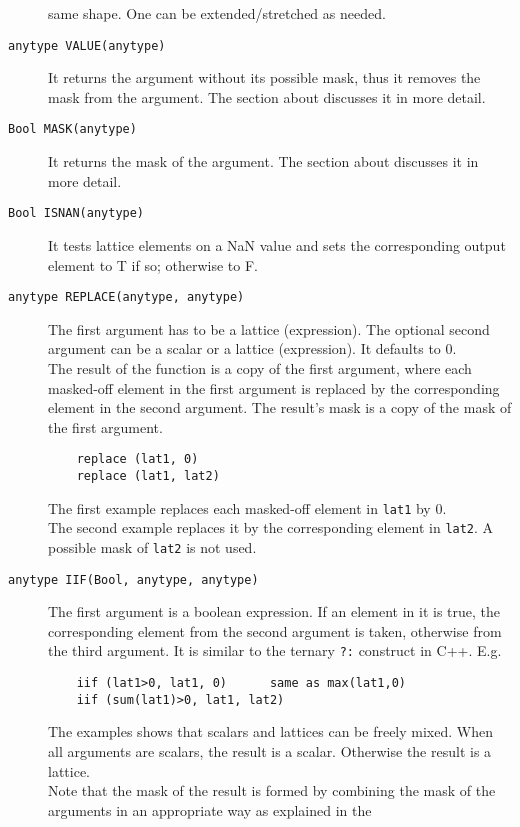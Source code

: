 \begin{description}
    same shape. One can be extended/stretched as needed.
  \item[ \texttt{anytype VALUE(anytype)}]
    It returns the argument without its possible mask, thus it removes
    the mask from the argument.
    The section about 
    discusses it in more detail.
  \item[ \texttt{Bool MASK(anytype)}]
    It returns the mask of the argument.
    The section about 
    discusses it in more detail.
  \item[ \texttt{Bool ISNAN(anytype)}]
    It tests lattice elements on a NaN value and sets the corresponding
    output element to T if so; otherwise to F.
  \item[ \texttt{anytype REPLACE(anytype, anytype)}]
    The first argument has to be a lattice (expression).
    The optional second argument can be a scalar or a lattice
    (expression). It defaults to 0.
    \\The result of the function is a copy of the first argument,
    where each masked-off element in the first argument is replaced by the
    corresponding element in the second argument. The result's mask is
    a copy of the mask of the first argument.
    \begin{verbatim}
    replace (lat1, 0)
    replace (lat1, lat2)
    \end{verbatim}
    The first example replaces each masked-off element in
    \texttt{lat1} by 0.
    \\The second example replaces it by the corresponding element in
    \texttt{lat2}. A possible mask of \texttt{lat2} is not used.
  \item[ \texttt{anytype IIF(Bool, anytype, anytype)}]
    The first argument is a boolean expression. If an element in
    it is true, the corresponding element from the second argument is
    taken, otherwise from the third argument. It is similar to the
    ternary \texttt{?:} construct in C++. E.g.
    \begin{verbatim}
    iif (lat1>0, lat1, 0)      same as max(lat1,0)
    iif (sum(lat1)>0, lat1, lat2)
    \end{verbatim}
    The examples shows that scalars and lattices can be freely mixed.
    When all arguments are scalars, the result is a scalar. Otherwise
    the result is a lattice.
    \\ Note that the mask of the result is formed by combining the
    mask of the arguments in an appropriate way as explained in the

\end{description}
